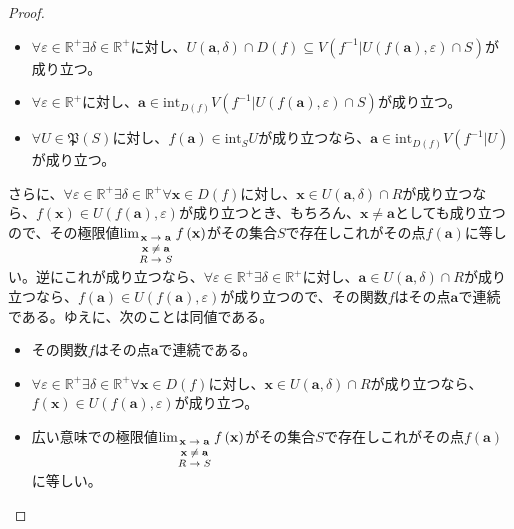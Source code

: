 \documentclass[dvipdfmx]{jsarticle}
\begin{document}
\begin{proof}
\begin{itemize}
\item
  $\forall\varepsilon \in \mathbb{R}^{+}\exists\delta \in \mathbb{R}^{+}$に対し、$U\left( \mathbf{a},\delta \right) \cap D(f) \subseteq V\left( f^{- 1}|U\left( f\left( \mathbf{a} \right),\varepsilon \right) \cap S \right)$が成り立つ。
\item
  $\forall\varepsilon \in \mathbb{R}^{+}$に対し、$\mathbf{a} \in \mathrm{int}_{D(f)}{V\left( f^{- 1}|U\left( f\left( \mathbf{a} \right),\varepsilon \right) \cap S \right)}$が成り立つ。
\item
  $\forall U \in \mathfrak{P}(S)$に対し、$f\left( \mathbf{a} \right) \in \mathrm{int}_{S}U$が成り立つなら、$\mathbf{a} \in \mathrm{int}_{D(f)}{V\left( f^{- 1}|U \right)}$が成り立つ。
\end{itemize}
さらに、$\forall\varepsilon \in \mathbb{R}^{+}\exists\delta \in \mathbb{R}^{+}\forall\mathbf{x} \in D(f)$に対し、$\mathbf{x} \in U\left( \mathbf{a},\delta \right) \cap R$が成り立つなら、$f\left( \mathbf{x} \right) \in U\left( f\left( \mathbf{a} \right),\varepsilon \right)$が成り立つとき、もちろん、$\mathbf{x} \neq \mathbf{a}$としても成り立つので、その極限値$\lim_{\scriptsize \begin{matrix} \mathbf{x} \rightarrow \mathbf{a} \\ \mathbf{x} \neq \mathbf{a}\\R \rightarrow S \end{matrix}}{f\left( \mathbf{x} \right)}$がその集合$S$で存在しこれがその点$f\left( \mathbf{a} \right)$に等しい。逆にこれが成り立つなら、$\forall\varepsilon \in \mathbb{R}^{+}\exists\delta \in \mathbb{R}^{+}$に対し、$\mathbf{a} \in U\left( \mathbf{a},\delta \right) \cap R$が成り立つなら、$f\left( \mathbf{a} \right) \in U\left( f\left( \mathbf{a} \right),\varepsilon \right)$が成り立つので、その関数$f$はその点$\mathbf{a}$で連続である。ゆえに、次のことは同値である。
\begin{itemize}
\item
  その関数$f$はその点$\mathbf{a}$で連続である。
\item
  $\forall\varepsilon \in \mathbb{R}^{+}\exists\delta \in \mathbb{R}^{+}\forall\mathbf{x} \in D(f)$に対し、$\mathbf{x} \in U\left( \mathbf{a},\delta \right) \cap R$が成り立つなら、$f\left( \mathbf{x} \right) \in U\left( f\left( \mathbf{a} \right),\varepsilon \right)$が成り立つ。
\item
  広い意味での極限値$\lim_{\scriptsize \begin{matrix} \mathbf{x} \rightarrow \mathbf{a} \\ \mathbf{x} \neq \mathbf{a} \\ R \rightarrow S \end{matrix}}{f\left( \mathbf{x} \right)}$がその集合$S$で存在しこれがその点$f\left( \mathbf{a} \right)$に等しい。
\end{itemize}
\end{proof}
\end{document}
